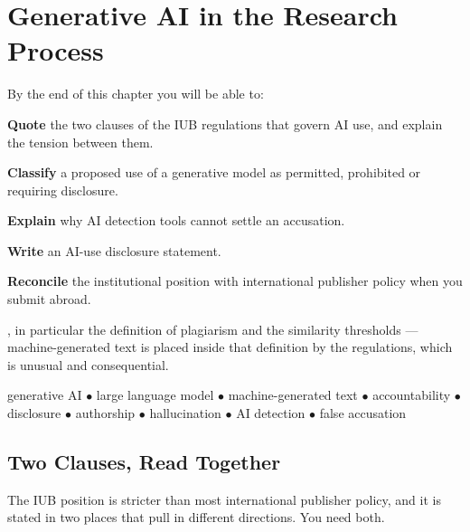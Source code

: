 \chapter{Generative AI in the Research Process}\label{ch:genai}

\begin{outcomes}
By the end of this chapter you will be able to:
\begin{tight}
  \item \textbf{Quote} the two clauses of the IUB regulations that govern AI
    use, and explain the tension between them.
  \item \textbf{Classify} a proposed use of a generative model as permitted,
    prohibited or requiring disclosure.
  \item \textbf{Explain} why AI detection tools cannot settle an accusation.
  \item \textbf{Write} an AI-use disclosure statement.
  \item \textbf{Reconcile} the institutional position with international
    publisher policy when you submit abroad.
\end{tight}
\end{outcomes}

\begin{prereq}
, in particular the definition of plagiarism and the
similarity thresholds --- machine-generated text is placed inside that
definition by the regulations, which is unusual and consequential.
\end{prereq}

\begin{keyterms}
generative AI $\bullet$ large language model $\bullet$ machine-generated text
$\bullet$ accountability $\bullet$ disclosure $\bullet$ authorship $\bullet$
hallucination $\bullet$ AI detection $\bullet$ false accusation
\end{keyterms}

\section{Two Clauses, Read Together}

The IUB position is stricter than most international publisher policy, and it
is stated in two places that pull in different directions. You need both.

